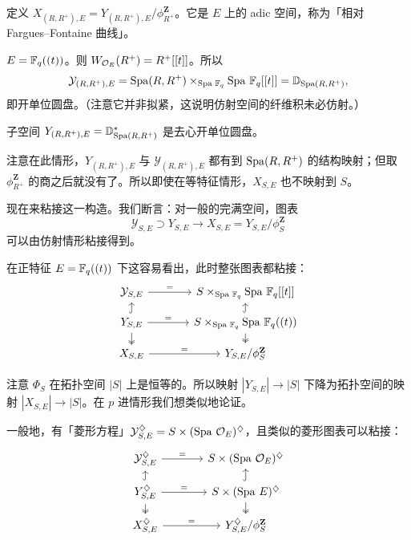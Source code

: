 \begin{definition}
定义 $X_{(R,R^+),E}=Y_{(R,R^+),E}/\phi_{R^+}^{\mathbf Z}$。它是 $E$ 上的 adic 空间，称为「相对 Fargues--Fontaine 曲线」。
\end{definition}

\begin{example}[等特征]
$E=\mathbb{F}_q((t))$。则 $W_{\mathcal{O}_E}(R^+)=R^+[[t]]$。所以
\[
\mathcal Y_{(R,R^+),E}=\operatorname{Spa}(R,R^+)\times_{\operatorname{Spa}\,\mathbb{F}_q}\operatorname{Spa}\,\mathbb{F}_q[[t]]=\mathbb D_{\operatorname{Spa}(R,R^+)},
\]
即开单位圆盘。（注意它并非拟紧，这说明仿射空间的纤维积未必仿射。）

子空间 $Y_{(R,R^+),E}=\mathbb D^*_{\operatorname{Spa}(R,R^+)}$ 是去心开单位圆盘。
\end{example}


注意在此情形，$Y_{(R,R^+),E}$ 与 $\mathcal Y_{(R,R^+),E}$ 都有到 $\operatorname{Spa}(R,R^+)$ 的结构映射；但取 $\phi_{R^+}^{\mathbf Z}$ 的商之后就没有了。所以即使在等特征情形，$X_{S,E}$ 也不映射到 $S$。

现在来粘接这一构造。我们断言：对一般的完满空间，图表
\[
\mathcal Y_{S,E}\supset Y_{S,E}\to X_{S,E}=Y_{S,E}/\phi_S^{\mathbf Z}
\]
可以由仿射情形粘接得到。

在正特征 $E=\mathbb{F}_q((t))$ 下这容易看出，此时整张图表都粘接：
\[
\begin{tikzcd}[column sep=large,row sep=small]
\mathcal Y_{S,E} \arrow[r, "="] & S\times_{\Spa\,\Fq}\Spa\,\Fq[[t]] \\
Y_{S,E} \arrow[r, "="] \arrow[u, hook] \arrow[d, two heads] & S\times_{\Spa\,\Fq}\Spa\,\Fq((t)) \arrow[u, hook] \arrow[d, two heads] \\
X_{S,E} \arrow[r, "="] & Y_{S,E}/\phi_S^{\mathbf Z}
\end{tikzcd}
\]

注意 $\Phi_S$ 在拓扑空间 $|S|$ 上是恒等的。所以映射 $|Y_{S,E}|\to|S|$ 下降为拓扑空间的映射 $|X_{S,E}|\to|S|$。在 $p$ 进情形我们想类似地论证。

\begin{remark}
一般地，有「菱形方程」$\mathcal Y^{\diamondsuit}_{S,E}=S\times(\operatorname{Spa}\,\mathcal{O}_E)^{\diamondsuit}$，且类似的菱形图表可以粘接：
\[
\begin{tikzcd}[column sep=large,row sep=small]
\mathcal Y^\diam_{S,E} \arrow[r, "="] & S\times(\Spa\,\oo_E)^\diam \\
Y^\diam_{S,E} \arrow[r, "="] \arrow[u, hook] \arrow[d, two heads] & S\times(\Spa\,E)^\diam \arrow[u, hook] \arrow[d, two heads] \\
X^\diam_{S,E} \arrow[r, "="] & Y^\diam_{S,E}/\phi_S^{\mathbf Z}
\end{tikzcd}
\]
\end{remark}

